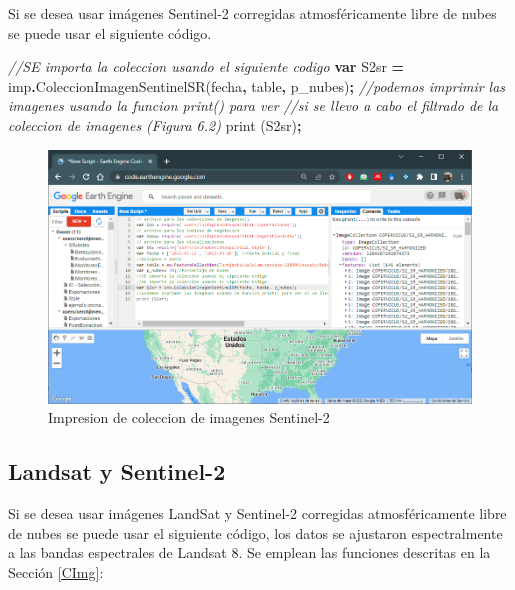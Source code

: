 \documentclass[
]{book}
\newenvironment{Shaded}{\begin{snugshade}}{\end{snugshade}}
\newcommand{\CommentTok}[1]{\textcolor[rgb]{0.56,0.35,0.01}{\textit{#1}}}
\newcommand{\FunctionTok}[1]{\textcolor[rgb]{0.00,0.00,0.00}{#1}}
\newcommand{\KeywordTok}[1]{\textcolor[rgb]{0.13,0.29,0.53}{\textbf{#1}}}
\newcommand{\NormalTok}[1]{#1}
\newcommand{\OperatorTok}[1]{\textcolor[rgb]{0.81,0.36,0.00}{\textbf{#1}}}
\begin{document}
Si se desea usar imágenes Sentinel-2 corregidas atmosféricamente libre de nubes se puede usar el siguiente código.

\begin{Shaded}
\begin{Highlighting}[]
\CommentTok{//SE importa la coleccion usando el siguiente codigo}
\KeywordTok{var}\NormalTok{ S2sr }\OperatorTok{=}\NormalTok{ imp}\OperatorTok{.}\FunctionTok{ColeccionImagenSentinelSR}\NormalTok{(fecha}\OperatorTok{,}\NormalTok{ table}\OperatorTok{,}\NormalTok{ p\_nubes)}\OperatorTok{;}
\CommentTok{//podemos imprimir las imagenes usando la funcion print() para ver }
\CommentTok{//si se llevo a cabo el filtrado de la coleccion de imagenes (Figura 6.2)}
\FunctionTok{print}\NormalTok{ (S2sr)}\OperatorTok{;}
\end{Highlighting}
\end{Shaded}

\begin{figure}

{\centering \includegraphics[width=0.85\linewidth]{./images/Figure71} 

}

\caption{Impresion de coleccion de imagenes Sentinel-2}\label{fig:figV2}
\end{figure}

\hypertarget{LanSen}{%
\subsection{Landsat y Sentinel-2}\label{LanSen}}

Si se desea usar imágenes LandSat y Sentinel-2 corregidas atmosféricamente libre de nubes se puede usar el siguiente código, los datos se ajustaron espectralmente a las bandas espectrales de Landsat 8. Se emplean las funciones descritas en la Sección \ref{CImg}:
\end{document}
